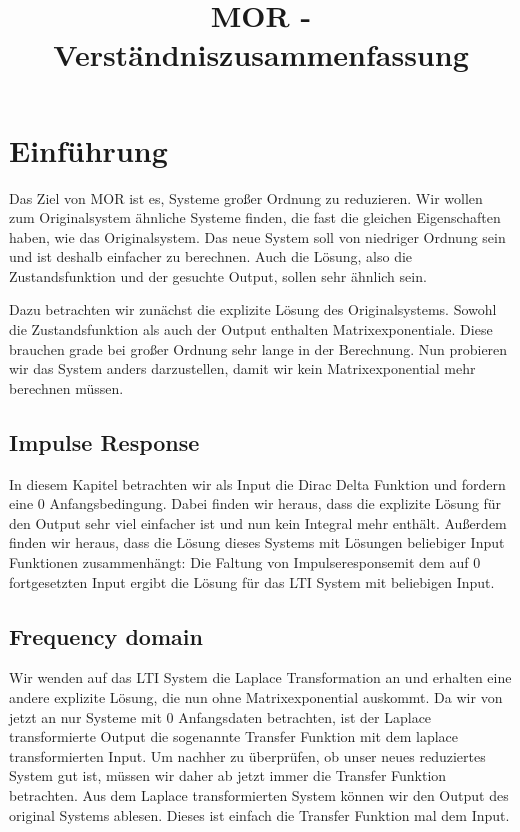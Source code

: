 \documentclass[]{article}
\title{MOR - Verständniszusammenfassung}
\author{}
\begin{document}
\maketitle

\section{Einführung}
Das Ziel von MOR ist es, Systeme großer Ordnung zu reduzieren. Wir wollen zum Originalsystem ähnliche Systeme finden, die fast die gleichen Eigenschaften haben, wie das Originalsystem. Das neue System soll von niedriger Ordnung sein und ist deshalb einfacher zu berechnen. Auch die Lösung, also die Zustandsfunktion und der gesuchte Output, sollen sehr ähnlich sein. 

Dazu betrachten wir zunächst die explizite Lösung des Originalsystems. Sowohl die Zustandsfunktion als auch der Output enthalten Matrixexponentiale. Diese brauchen grade bei großer Ordnung sehr lange in der Berechnung. Nun probieren wir das System anders darzustellen, damit wir kein Matrixexponential mehr berechnen müssen. 

\subsection{Impulse Response}
In diesem Kapitel betrachten wir als Input die Dirac Delta Funktion und fordern eine 0 Anfangsbedingung. Dabei finden wir heraus, dass die explizite Lösung für den Output sehr viel einfacher ist und nun kein Integral mehr enthält. Außerdem finden wir heraus, dass die Lösung dieses Systems mit Lösungen beliebiger Input Funktionen zusammenhängt: Die Faltung von \glqq Impulseresponse\grqq mit dem auf 0 fortgesetzten Input ergibt die Lösung für das LTI System mit beliebigen Input.  

\subsection{Frequency domain}
Wir wenden auf das LTI System die Laplace Transformation an und erhalten eine andere explizite Lösung, die nun ohne Matrixexponential auskommt. Da wir von jetzt an nur Systeme mit 0 Anfangsdaten betrachten, ist der Laplace transformierte Output die sogenannte Transfer Funktion mit dem laplace transformierten Input. Um nachher zu überprüfen, ob unser neues reduziertes System gut ist, müssen wir daher ab jetzt immer die Transfer Funktion betrachten. Aus dem Laplace transformierten System können wir den Output des original Systems ablesen. Dieses ist einfach die Transfer Funktion mal dem Input. 
\end{document}

